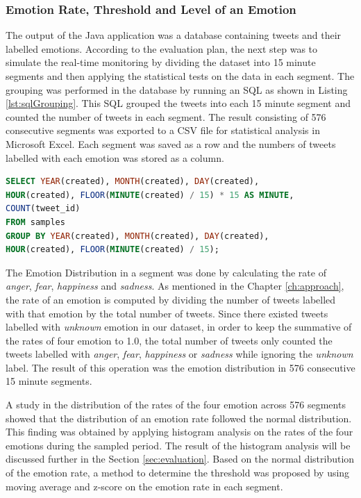 \clearpage
\subsubsection{Emotion Rate, Threshold and Level of an Emotion}
The output of the Java application was a database containing tweets and their labelled emotions. According to the evaluation plan, the next step was to simulate the real-time monitoring by dividing the dataset into 15 minute segments and then applying the statistical tests on the data in each segment. The grouping was performed in the database by running an SQL as shown in Listing \ref{lst:sqlGrouping}. This SQL grouped the tweets into each 15 minute segment and counted the number of tweets in each segment. The result consisting of 576 consecutive segments was exported to a CSV file for statistical analysis in Microsoft Excel. Each segment was saved as a row and the numbers of tweets labelled with each emotion was stored as a column.

\begin{lstlisting}[language=SQL,caption=Segment Division in SQL,label=lst:sqlGrouping]
SELECT YEAR(created), MONTH(created), DAY(created), 
HOUR(created), FLOOR(MINUTE(created) / 15) * 15 AS MINUTE, 
COUNT(tweet_id) 
FROM samples 
GROUP BY YEAR(created), MONTH(created), DAY(created), 
HOUR(created), FLOOR(MINUTE(created) / 15);
\end{lstlisting}

The Emotion Distribution in a segment was done by calculating the rate of \textit{anger}, \textit{fear}, \textit{happiness} and \textit{sadness}. As mentioned in the Chapter \ref{ch:approach}, the rate of an emotion is computed by dividing the number of tweets labelled with that emotion by the total number of tweets. Since there existed tweets labelled with \textit{unknown} emotion in our dataset, in order to keep the summative of the rates of four emotion to 1.0, the total number of tweets only counted the tweets labelled with \textit{anger}, \textit{fear}, \textit{happiness} or \textit{sadness} while ignoring the \textit{unknown} label. The result of this operation was the emotion distribution in 576 consecutive 15 minute segments. 

A study in the distribution of the rates of the four emotion across 576 segments showed that the distribution of an emotion rate followed the normal distribution. This finding was obtained by applying histogram analysis on the rates of the four emotions during the sampled period. The result of the histogram analysis will be discussed further in the Section \ref{sec:evaluation}. Based on the normal distribution of the emotion rate, a method to determine the threshold was proposed by using moving average and z-score on the emotion rate in each segment. 

